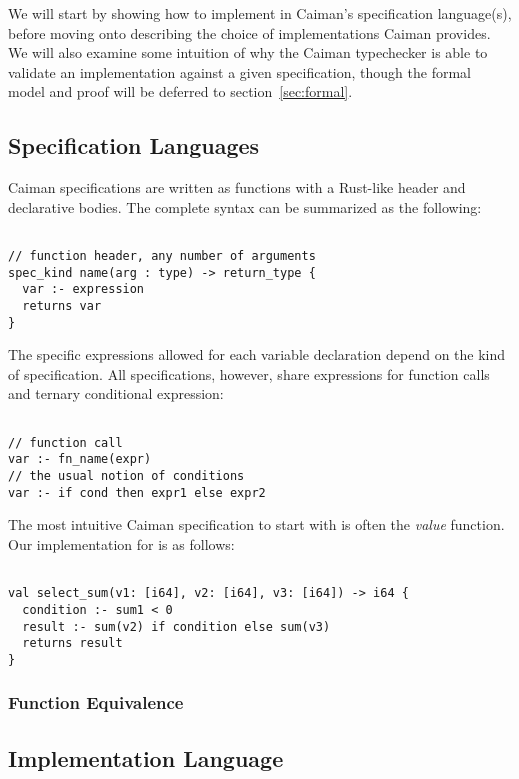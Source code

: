 We will start by showing how to implement  in Caiman's specification language(s), before moving onto describing the choice of implementations Caiman provides.  We will also examine some intuition of why the Caiman typechecker is able to validate an implementation against a given specification, though the formal model and proof will be deferred to section~\ref{sec:formal}.

\subsection{Specification Languages}
\label{subsec:spec}

Caiman specifications are written as functions with a Rust-like header and declarative bodies.  The complete syntax can be summarized as the following:
%
\begin{lstlisting}

// function header, any number of arguments
spec_kind name(arg : type) -> return_type {
  var :- expression
  returns var
}
\end{lstlisting}
%
The specific expressions allowed for each variable declaration depend on the kind of specification.  All specifications, however, share expressions for function calls and ternary conditional expression:
%
\begin{lstlisting}

// function call
var :- fn_name(expr)
// the usual notion of conditions
var :- if cond then expr1 else expr2
\end{lstlisting}
%
The most intuitive Caiman specification to start with is often the \textit{value} function.  Our implementation for  is as follows:
%
\begin{lstlisting}

val select_sum(v1: [i64], v2: [i64], v3: [i64]) -> i64 {
  condition :- sum1 < 0
  result :- sum(v2) if condition else sum(v3)
  returns result
}
\end{lstlisting}
%

\subsubsection{Function Equivalence}
\label{subsec:equivalence}

\subsection{Implementation Language}
\label{subsec:implementation}

